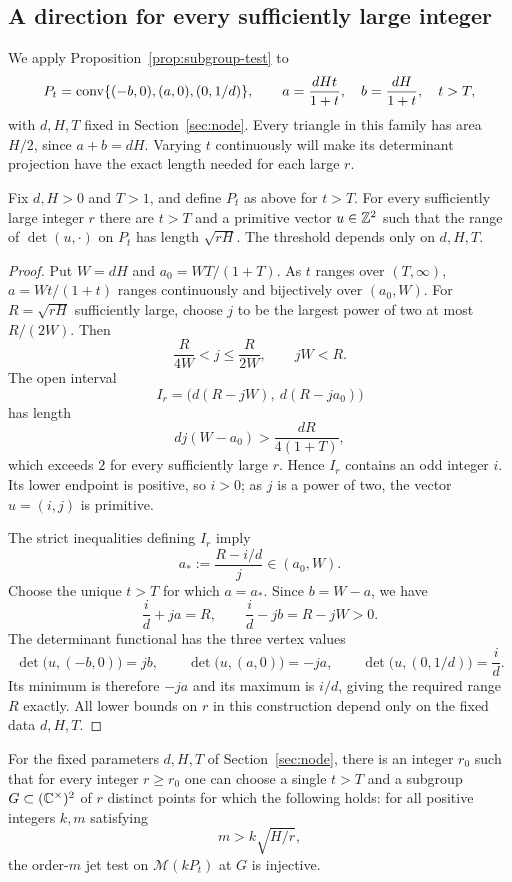 \subsection{A direction for every sufficiently large integer}

We apply Proposition~\ref{prop:subgroup-test} to
\[
 P_t=\operatorname{conv}\{(-b,0),(a,0),(0,1/d)\},
 \qquad
 a=\frac{dHt}{1+t},\quad b=\frac{dH}{1+t},\quad t>T,
\]
with $d,H,T$ fixed in Section~\ref{sec:node}.  Every triangle in this
family has area $H/2$, since $a+b=dH$.  Varying $t$ continuously will
make its determinant projection have the exact length needed for each
large $r$.

\begin{lemma}\label{lem:direction}
Fix $d,H>0$ and $T>1$, and define $P_t$ as above for $t>T$.
For every sufficiently large integer $r$ there are $t>T$ and a primitive
vector $u\in\mathbb Z^2$ such that the range of $\det(u,\cdot)$ on $P_t$ has
length $\sqrt{rH}$.  The threshold depends only on $d,H,T$.
\end{lemma}

\begin{proof}
Put $W=dH$ and $a_0=WT/(1+T)$.  As $t$ ranges over $(T,\infty)$,
$a=Wt/(1+t)$ ranges continuously and bijectively over $(a_0,W)$.
For $R=\sqrt{rH}$ sufficiently large, choose $j$ to be the largest power
of two at most $R/(2W)$.  Then
\[
 \frac{R}{4W}<j\leq\frac{R}{2W},
 \qquad jW<R.
\]
The open interval
\[
 I_r=\bigl(d(R-jW),\ d(R-ja_0)\bigr)
\]
has length
\[
 dj(W-a_0)>\frac{dR}{4(1+T)},
\]
which exceeds $2$ for every sufficiently large $r$.  Hence $I_r$
contains an odd integer $i$.  Its lower endpoint is positive, so $i>0$;
as $j$ is a power of two, the vector $u=(i,j)$ is primitive.

The strict inequalities defining $I_r$ imply
\[
 a_*:=\frac{R-i/d}{j}\in(a_0,W).
\]
Choose the unique $t>T$ for which $a=a_*$.  Since $b=W-a$, we have
\[
 \frac{i}{d}+ja=R,
 \qquad
 \frac{i}{d}-jb=R-jW>0.
\]
The determinant functional has the three vertex values
\[
 \det\bigl(u,(-b,0)\bigr)=jb,
 \qquad
 \det\bigl(u,(a,0)\bigr)=-ja,
 \qquad
 \det\bigl(u,(0,1/d)\bigr)=\frac{i}{d}.
\]
Its minimum is therefore $-ja$ and its maximum is $i/d$, giving the
required range $R$ exactly.  All lower bounds on $r$ in this construction
depend only on the fixed data $d,H,T$.
\end{proof}

\begin{corollary}\label{cor:torus-test}
For the fixed parameters $d,H,T$ of Section~\ref{sec:node}, there is an
integer $r_0$ such that for every integer $r\geq r_0$ one can choose a
single $t>T$ and a subgroup $G\subset(\mathbb C^\times)^2$ of $r$ distinct points for
which the following holds: for all positive integers $k,m$ satisfying
\[
 m>k\sqrt{H/r},
\]
the order-$m$ jet test on $\mathcal M(kP_t)$ at $G$ is injective.
\end{corollary}

